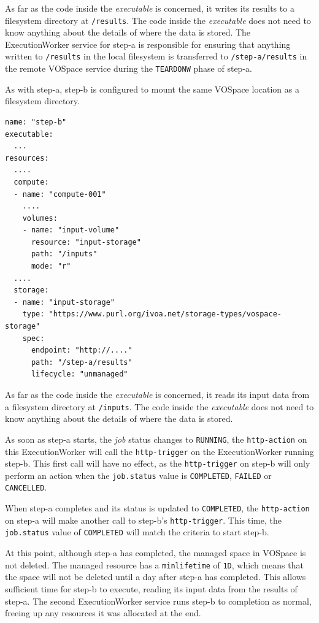 \documentclass[11pt,a4paper]{ivoa}
\newcommand{\vospace} {VOSpace}
\newcommand{\execworkerclass} {ExecutionWorker}
\newcommand{\codeword}[1] {\texttt{#1}}
\newcommand{\executable} {\textit{executable}}
\newcommand{\job} {\textit{job}}
\begin{document}
As far as the code inside the \executable{} is concerned, it writes its results to a
filesystem directory at \codeword{/results}.
The code inside the \executable{} does not need to know anything about the
details of where the data is stored.
The \execworkerclass{} service for step-a is responsible for ensuring that anything written to
\codeword{/results} in the local filesystem is transferred to \codeword{/step-a/results}
in the remote \vospace{} service during the \codeword{TEARDONW} phase of step-a.

As with step-a, step-b is configured to mount the same \vospace{} location
as a filesystem directory.

\begin{lstlisting}[]
name: "step-b"
executable:
  ...
resources:
  ....
  compute:
  - name: "compute-001"
    ....
    volumes:
    - name: "input-volume"
      resource: "input-storage"
      path: "/inputs"
      mode: "r"
  ....
  storage:
  - name: "input-storage"
    type: "https://www.purl.org/ivoa.net/storage-types/vospace-storage"
    spec:
      endpoint: "http://...."
      path: "/step-a/results"
      lifecycle: "unmanaged"
\end{lstlisting}

As far as the code inside the \executable{} is concerned, it reads
its input data from a filesystem directory at \codeword{/inputs}.
The code inside the \executable{} does not need to know anything about the
details of where the data is stored.

As soon as step-a starts, the \job{} status changes to \codeword{RUNNING},
the \codeword{http-action} on this \execworkerclass{} will call the \codeword{http-trigger}
on the \execworkerclass{} running step-b.
This first call will have no effect, as the \codeword{http-trigger}
on step-b will only perform an action when the \codeword{job.status}
value is \codeword{COMPLETED}, \codeword{FAILED} or \codeword{CANCELLED}.

When step-a completes and its status is updated to \codeword{COMPLETED},
the \codeword{http-action} on step-a will make another call to step-b's \codeword{http-trigger}.
This time, the \codeword{job.status} value of \codeword{COMPLETED} will match the
criteria to start step-b.

At this point, although step-a has completed, the managed space in \vospace{} is not deleted.
The managed resource has a \codeword{minlifetime} of \codeword{1D},
which means that the space will not be deleted until a day after step-a has completed.
This allows sufficient time for step-b to execute, reading its input data
from the results of step-a.
The second \execworkerclass{} service runs step-b to completion as normal,
freeing up any resources it was allocated at the end.
\end{document}
